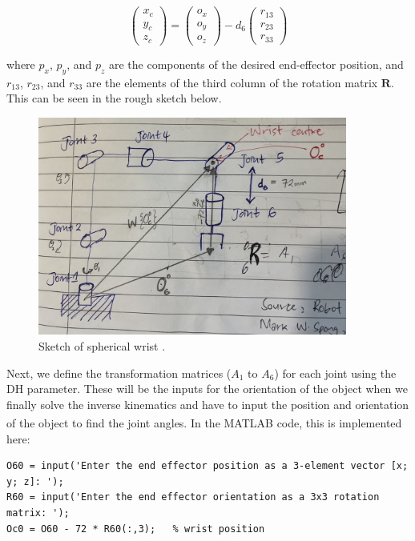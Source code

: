 \[
  \begin{pmatrix}
    x_c \\
    y_c \\
    z_c
  \end{pmatrix} =
  \begin{pmatrix}
    o_x \\
    o_y \\
    o_z
  \end{pmatrix} -
  d_6
  \begin{pmatrix}
    r_{13} \\
    r_{23} \\
    r_{33}
  \end{pmatrix}
\]

\noindent where \(p_x\), \(p_y\), and \(p_z\) are the components of the desired end-effector position, and \(r_{13}\), \(r_{23}\), and \(r_{33}\) are the elements of the third column of the rotation matrix \(\mathbf{R}\). This can be seen in the rough sketch below.

\begin{figure}[H]
  \centering
  \includegraphics[width=4.0in ]{pics/decoup_sketch.JPG}
  \caption{Sketch of spherical wrist .}
  \label{sphericalw}
\end{figure}


\noindent Next, we define the transformation matrices (\(A_1\) to \(A_6\)) for each joint using the DH parameter. These will be the inputs for the orientation of the object when we finally solve the inverse kinematics and have to input the position and orientation of the object to find the joint angles. In the MATLAB\textsuperscript{\textregistered} code, this is implemented here:

\begin{lstlisting}[frame=single,style=Matlab-Pyglike]
% Prompt for end effector position and orientation
O60 = input('Enter the end effector position as a 3-element vector [x; y; z]: ');
R60 = input('Enter the end effector orientation as a 3x3 rotation matrix: ');
Oc0 = O60 - 72 * R60(:,3);   % wrist position
\end{lstlisting}




